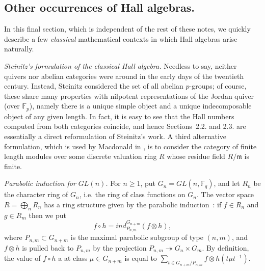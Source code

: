 \documentclass[a4paper,10pt]{amsart}
\def\tto{\twoheadrightarrow}
\numberwithin{equation}{section}
\begin{document}
\vspace{.2in}

\subsection{Other occurrences of Hall algebras.}

\vspace{.15in}

In this final section, which is independent of the rest of these notes, we quickly describe a few \textit{classical} mathematical contexts in which Hall algebras arise naturally.

\vspace{.2in}

\noindent
\textit{Steinitz's formulation of the classical Hall algebra.} Needless to say, neither quivers nor abelian categories were around in the early days of the twentieth century. Instead, Steinitz considered the set of all abelian $p$-groups; of course, these share many properties with nilpotent representations of the Jordan quiver (over $\mathbb{F}_p$), namely there is a unique simple object and a unique indecomposable object of any given length. In fact, it is easy to see that the Hall numbers computed from both categories coincide, and hence Sections~2.2. and 2.3. are essentially a direct reformulation of Steinitz's work. A third alternative formulation, which is used by Macdonald in \cite{Mac}, is to consider the category of finite length modules over some discrete valuation ring $R$ whose residue field $R/\mathfrak{m}$ is finite.

\vspace{.2in}

\noindent
\textit{Parabolic induction for $GL(n)$.} For $n \geq 1$, put $G_n=GL(n,\mathbb{F}_q)$, and let $R_n$ be the character ring of $G_n$, i.e. the ring of class functions on $G_n$. The vector space $R=\bigoplus_n R_n$ has a ring structure given by the parabolic induction~: if $f \in R_n$ and $g \in R_m$ then we put
$$f \circ h=ind_{P_{n,m}}^{G_{n+m}} (f \otimes h),$$
where $P_{n,m} \subset G_{n+m}$ is the maximal parabolic subgroup of type $(n,m)$, and $f \otimes h$ is pulled back to $P_{n,m}$ by the projection $P_{n,m} \tto G_n \times G_m$. By definition, the value of $f \circ h$ a at class $\mu \in G_{n+m}$ is equal to $\sum_{t \in G_{n+m}/P_{n,m}} f \otimes h(t \mu t^{-1})$.
\end{document}
